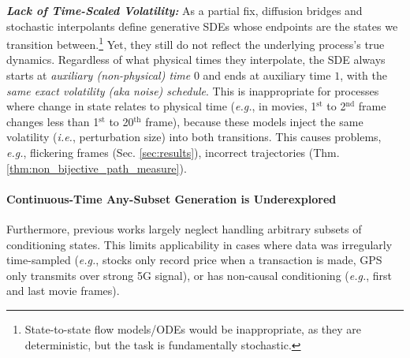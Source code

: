 \documentclass{article}
\begin{document}





\textit{\textbf{Lack of Time-Scaled Volatility:}} As a partial fix, diffusion bridges and stochastic interpolants \cite{zhou2023denoising, wang2024framebridge, lyu2024frame, li2023bbdm, liu2022let, peluchetti2023diffusion, peluchetti2023non, chen2024probabilistic} define generative SDEs whose endpoints are the states we transition between.\footnote{State-to-state flow models/ODEs would be inappropriate, as they are deterministic, but the task is fundamentally stochastic.} %
Yet, they still do not reflect the underlying process's true dynamics. Regardless of what physical times they interpolate, the SDE always starts at \textit{auxiliary (non-physical) time} $0$ and ends at auxiliary time $1$, with the \textit{same exact volatility (aka noise) schedule}.
This is inappropriate for processes where change in state relates to physical time (\textit{e.g.}, in movies, 1$^\text{st}$ to 2$^\text{nd}$ frame changes less than 1$^\text{st}$ to 20$^\text{th}$ frame), because these models inject the same volatility (\textit{i.e.}, perturbation size) into both transitions. This causes problems, \textit{e.g.}, flickering frames (Sec. \ref{sec:results}), incorrect trajectories (Thm. \ref{thm:non_bijective_path_measure}). %

\paragraph{Continuous-Time Any-Subset Generation is Underexplored} Furthermore, previous works largely neglect handling arbitrary subsets of conditioning states. This limits applicability in cases where data was irregularly time-sampled (\textit{e.g.}, stocks only record price when a transaction is made, GPS only transmits over strong 5G signal), or has non-causal conditioning (\textit{e.g.}, first and last movie frames).
\end{document}
